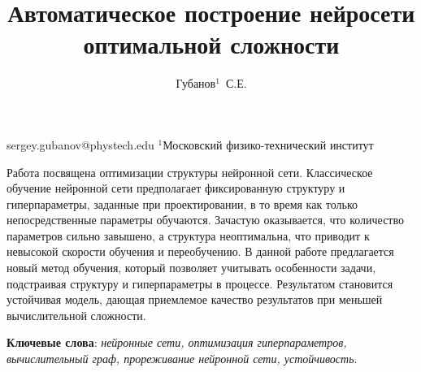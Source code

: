 \documentclass[12pt,twoside]{article}
\begin{document}
\title
    {Автоматическое построение нейросети оптимальной сложности}
\author
    {Губанов$^1$~С.Е.} %
\email
    {sergey.gubanov@phystech.edu}
\organization
    {$^1$Московский физико-технический институт}
\abstract
	{Работа посвящена оптимизации структуры нейронной сети. Классическое обучение нейронной сети предполагает фиксированную структуру и гиперпараметры, заданные при проектировании, в то время как только непосредственные параметры обучаются. Зачастую оказывается, что количество параметров сильно завышено, а структура неоптимальна, что приводит к невысокой скорости обучения и переобучению. В данной работе предлагается новый метод обучения, который позволяет учитывать особенности задачи, подстраивая структуру и гиперпараметры в процессе. Результатом становится устойчивая модель, дающая приемлемое качество результатов при меньшей вычислительной сложности.
		
\bigskip
\textbf{Ключевые слова}: \emph {нейронные сети, оптимизация гиперпараметров, вычислительный граф, прореживание нейронной сети, устойчивость}.

}
\maketitle



\end{document}
